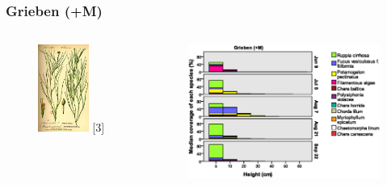 \documentclass{beamer}
\begin{document}
\begin{frame}
\frametitle{Grieben (+M)}
\begin{columns}
\begin{column}{4.8cm}
\begin{figure}
\includegraphics[width=0.75\textwidth]{images/Fotos/ruppia.jpg} {\small [3]}
\end{figure}
\end{column}
\begin{column}{8.0cm}
\begin{figure}
\includegraphics[width=\textwidth]{images/Wuchshoehenkartierung/Grieben+M1.eps}
\end{figure}
\end{column}
\end{columns}
\end{frame}
\end{document}
